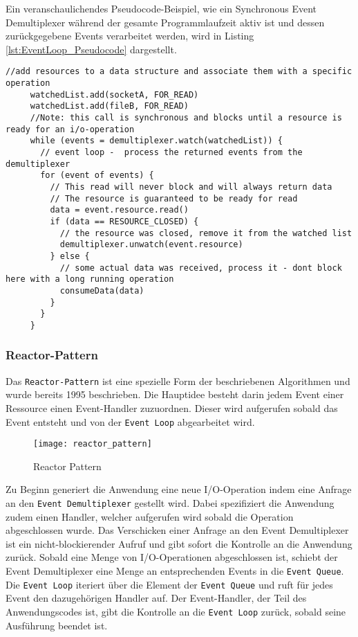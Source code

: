 Ein veranschaulichendes Pseudocode-Beispiel, wie ein Synchronous Event Demultiplexer während der
gesamte Programmlaufzeit aktiv ist und dessen zurückgegebene Events verarbeitet werden,
wird in Listing \ref{lst:EventLoop_Pseudocode} dargestellt.
\begin{lstlisting}[caption=Einfaches Pseudocode-Beispiel für Synchronous Event Demultiplexing mit Event Loop),
	 captionpos=b, label=lst:EventLoop_Pseudocode]
	 //add resources to a data structure and associate them with a specific operation
	 watchedList.add(socketA, FOR_READ)                            
	 watchedList.add(fileB, FOR_READ)
	 //Note: this call is synchronous and blocks until a resource is ready for an i/o-operation
	 while (events = demultiplexer.watch(watchedList)) {
	   // event loop -  process the returned events from the demultiplexer
	   for (event of events) {
		 // This read will never block and will always return data
		 // The resource is guaranteed to be ready for read
		 data = event.resource.read()
		 if (data == RESOURCE_CLOSED) {
		   // the resource was closed, remove it from the watched list
		   demultiplexer.unwatch(event.resource)
		 } else {
		   // some actual data was received, process it - dont block here with a long running operation
		   consumeData(data)
		 }
	   }
	 }
\end{lstlisting}\parencite[Event Demultiplexing]{NodeJSDesignPatterns}

\subsubsection{Reactor-Pattern}
\label{subsubsec:reactor_pattern}
Das \verb|Reactor-Pattern| ist eine spezielle Form der beschriebenen Algorithmen und wurde bereits 1995 beschrieben.\parencite{SchmidtReactorPattern}
Die Hauptidee besteht darin jedem Event einer Ressource einen Event-Handler zuzuordnen.
Dieser wird aufgerufen sobald das Event entsteht und von der \verb|Event Loop| abgearbeitet wird.

\begin{figure}[ht]
	\centering
	\texttt{[image: reactor\_pattern]}
	\caption{Reactor Pattern \parencite[Abbildung 1.3]{NodeJSDesignPatterns}}
	\label{fig:reactor_pattern}
\end{figure}

Zu Beginn generiert die Anwendung eine neue I/O-Operation indem eine Anfrage an den \verb|Event Demultiplexer| gestellt wird.
Dabei spezifiziert die Anwendung zudem einen Handler, welcher aufgerufen wird sobald die Operation abgeschlossen wurde.
Das Verschicken einer Anfrage an den Event Demultiplexer ist ein nicht-blockierender Aufruf und gibt sofort die Kontrolle
an die Anwendung zurück.
Sobald eine Menge von I/O-Operationen abgeschlossen ist, schiebt der Event Demultiplexer eine Menge an entsprechenden Events
in die \verb|Event Queue|.
Die \verb|Event Loop| iteriert über die Element der \verb|Event Queue| und ruft für jedes Event den dazugehörigen Handler auf.
Der Event-Handler, der Teil des Anwendungscodes ist, gibt die Kontrolle an die \verb|Event Loop| zurück, sobald seine Ausführung
beendet ist.

